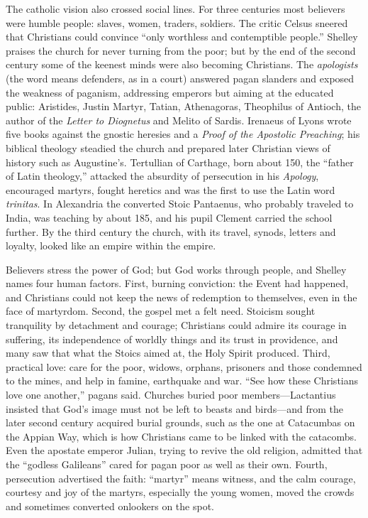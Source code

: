 The catholic vision also crossed social lines. For three centuries most believers were humble people:
slaves, women, traders, soldiers. The critic Celsus sneered that Christians could convince ``only
worthless and contemptible people.'' Shelley praises the church for never turning from the poor; but by the end of the second century some of the keenest minds were also becoming Christians.
The \emph{apologists} (the word means defenders, as in a court) answered pagan slanders and exposed the
weakness of paganism, addressing emperors but aiming at the educated public: Aristides, Justin Martyr,
Tatian, Athenagoras, Theophilus of Antioch, the author of the \emph{Letter to Diognetus} and Melito of
Sardis. Irenaeus of Lyons wrote five books against the gnostic heresies and a \emph{Proof of the
Apostolic Preaching}; his biblical theology steadied the church and prepared later Christian views of
history such as Augustine's. Tertullian of Carthage, born about 150, the ``father of Latin theology,''
attacked the absurdity of persecution in his \emph{Apology}, encouraged martyrs, fought heretics and
was the first to use the Latin word \emph{trinitas}. In Alexandria the converted Stoic Pantaenus, who
probably traveled to India, was teaching by about 185, and his pupil Clement carried the school
further. By the third century the church, with its travel, synods, letters and loyalty, looked like an
empire within the empire.

Believers stress the power of God; but God works through people, and Shelley names four human factors.
First, burning conviction: the Event had happened, and Christians could not keep the news of
redemption to themselves, even in the face of martyrdom. Second, the gospel met a felt need. Stoicism
sought tranquility by detachment and courage; Christians could admire its courage in suffering, its
independence of worldly things and its trust in providence, and many saw that what the Stoics aimed
at, the Holy Spirit produced. Third, practical love: care for the poor, widows, orphans, prisoners and
those condemned to the mines, and help in famine, earthquake and war. ``See how these Christians love
one another,'' pagans said. Churches buried poor members---Lactantius insisted that God's image must
not be left to beasts and birds---and from the later second century acquired burial grounds, such as
the one at Catacumbas on the Appian Way, which is how Christians came to be linked with the catacombs.
Even the apostate emperor Julian, trying to revive the old religion, admitted that the ``godless
Galileans'' cared for pagan poor as well as their own. Fourth, persecution advertised the faith:
``martyr'' means witness, and the calm courage, courtesy and joy of the martyrs, especially the young
women, moved the crowds and sometimes converted onlookers on the spot.

